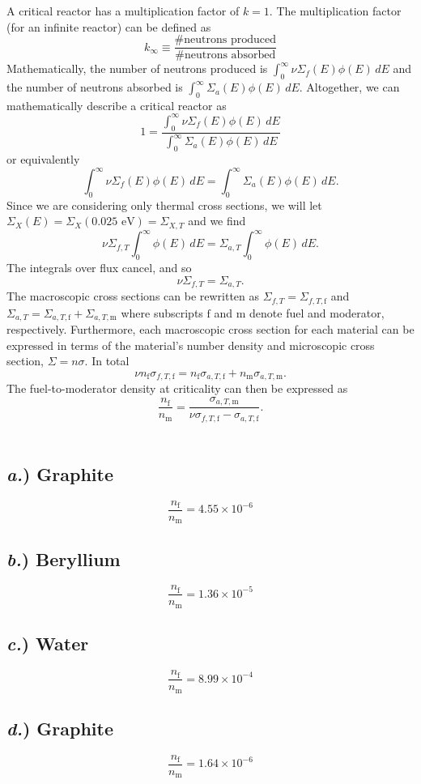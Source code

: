 \documentclass{article}
\begin{document}
A critical reactor has a multiplication factor of $k=1$. The multiplication factor (for an infinite reactor) can be defined as
$$ k_{\infty} \equiv \frac{\text{\# neutrons produced}}{\text{\# neutrons absorbed}} $$
Mathematically, the number of neutrons produced is $\int_0^{\infty} \nu \Sigma_f(E)\phi(E)\,dE$ and the number of neutrons absorbed is $\int_0^{\infty} \Sigma_a(E)\phi(E)\,dE$. Altogether, we can mathematically describe a critical reactor as 
$$ 1 = \frac{\int_0^{\infty} \nu \Sigma_f(E)\phi(E)\,dE}{\int_0^{\infty} \Sigma_a(E)\phi(E)\,dE} $$
or equivalently
$$ \int_0^{\infty} \nu \Sigma_f(E)\phi(E)\,dE = \int_0^{\infty} \Sigma_a(E)\phi(E)\,dE. $$
Since we are considering only thermal cross sections, we will let $\Sigma_X(E) = \Sigma_X(0.025\text{ eV}) = \Sigma_{X,T}$ and we find
$$ \nu \Sigma_{f,T} \int_0^{\infty} \phi(E)\,dE = \Sigma_{a,T} \int_0^{\infty} \phi(E)\,dE. $$
The integrals over flux cancel, and so
$$ \nu \Sigma_{f,T} = \Sigma_{a,T} .$$
The macroscopic cross sections can be rewritten as $\Sigma_{f,T} = \Sigma_{f,T,\text{f}}$ and $\Sigma_{a,T} = \Sigma_{a,T,\text{f}} + \Sigma_{a,T,\text{m}}$ where subscripts $\text{f}$ and $\text{m}$ denote fuel and moderator, respectively. Furthermore, each macroscopic cross section for each material can be expressed in terms of the material's number density and microscopic cross section, $\Sigma = n\sigma$. In total
$$ \nu n_{\text{f}} \sigma_{f,T,\text{f}} = n_{\text{f}} \sigma_{a,T,\text{f}} + n_{\text{m}} \sigma_{a,T,\text{m}} .$$
The fuel-to-moderator density at criticality can then be expressed as
$$ \frac{n_{\text{f}}}{n_{\text{m}}} = \frac{\sigma_{a,T,\text{m}}}{\nu \sigma_{f,T,\text{f}} - \sigma_{a,T,\text{f}}} .$$
\-\\

\begin{multicols}{4}
\subsection*{\textit{a.}) \normalsize Graphite}
$$ \frac{n_{\text{f}}}{n_{\text{m}}} = 4.55\times10^{-6}$$

\subsection*{\textit{b.}) \normalsize Beryllium}
$$ \frac{n_{\text{f}}}{n_{\text{m}}} = 1.36\times10^{-5}$$

\subsection*{\textit{c.}) \normalsize Water}
$$ \frac{n_{\text{f}}}{n_{\text{m}}} = 8.99\times10^{-4}$$

\subsection*{\textit{d.}) \normalsize Graphite}
$$ \frac{n_{\text{f}}}{n_{\text{m}}} = 1.64\times10^{-6}$$
\end{multicols}
\end{document}
